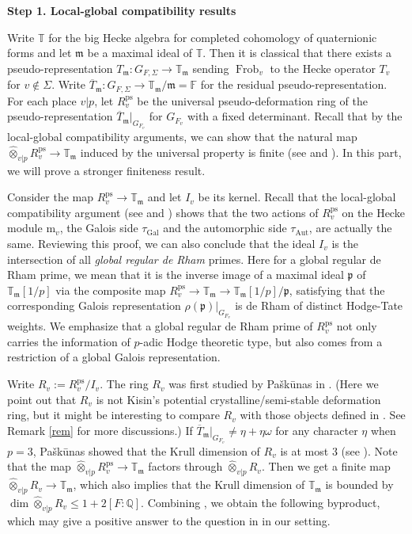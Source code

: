 \documentclass[a4paper, 12pt]{amsart}
\DeclareMathOperator{\Gal}{Gal}
\DeclareMathOperator{\Frob}{Frob}
\def\ps{\mathrm{ps}}
\newcommand{\F}{\mathbb{F}}
\newcommand{\Q}{\mathbb{Q}}
\newcommand{\T}{\mathbb{T}}
\newcommand{\kp}{\mathfrak{p}}
\newcommand{\km}{\mathfrak{m}}
\newcommand{\mm}{\mathrm{m}}
\begin{document}
	\textbf{Step 1.  Local-global compatibility results}
	
	Write $\T$ for the big Hecke algebra for completed cohomology of quaternionic forms and let $\km$ be a maximal ideal of $\T$. Then it is classical that there exists a pseudo-representation $T_\km: G_{F, \Sigma} \to  \T_{\km}$ sending $\Frob_v$ to the Hecke operator $T_v$ for $v \notin \Sigma$. Write $\overline{T}_\km: G_{F, \Sigma} \to  \T_{\km}/\km = \F$ for the residual pseudo-representation. For each place $v|p$, let $R_v^\ps$ be the universal pseudo-deformation ring of the pseudo-representation $\overline{T}_\km|_{G_{F_v}}$ for $G_{F_v}$ with a fixed determinant. Recall that by the local-global compatibility arguments, we can show that the natural map $\widehat{\otimes}_{v|p} R_v^\ps \to \T_{\km}$ induced by the universal property is finite (see \cite[Corollary 3.5.8]{pan2022fontaine} and \cite[Corollary 3.3.7]{Zhang:2024aa}). In this part, we will prove a stronger finiteness result.
	
	Consider the map $R_v^\ps \to \T_{\km} $ and let $I_v$ be its kernel. Recall that the local-global compatibility argument (see \cite[Theorem 3.5.3]{pan2022fontaine} and \cite[Theorem 3.3.3]{Zhang:2024aa}) shows that the two actions of $R_v^\ps$ on the Hecke module $\mm_v$, the Galois side $\tau_{\Gal}$ and the automorphic side $\tau_{\mathrm{Aut}}$, are actually the same. Reviewing this proof, we can also conclude that the ideal $I_v$ is the intersection of all \textit{global regular de Rham} primes. Here for a global regular de Rham prime, we mean that it is the inverse image of a maximal ideal $\kp$ of $ \T_{\km}[1/p]$ via the composite map $ R_v^\ps \to \T_{\km} \to \T_{\km}[1/p]/\kp$, satisfying that the corresponding Galois representation $\rho(\kp)|_{G_{F_v}}$ is de Rham of distinct Hodge-Tate weights. We emphasize that a global regular de Rham prime of $R_v^\ps$ not only carries the information of $p$-adic Hodge theoretic type, but also comes from a restriction of a global Galois representation.
	
	Write $R_v :=R_v^\ps/I_v $. The ring $R_v$ was first studied by Pašk\=unas in \cite{Paskunas_2021}. (Here we point out that $R_v$ is not Kisin's potential crystalline/semi-stable deformation ring, but it might be interesting to compare $R_v$ with those objects defined in \cite{Kisin2008}. See Remark \ref{rem} for more discussions.)  If $\overline{T}_\km|_{G_{F_v}} \ne \eta+\eta\omega$ for any character $\eta$ when $p=3$, Pašk\=unas showed that the Krull dimension of $R_v$ is at most $3$ (see \cite[Corollary 5.13]{Paskunas_2021}). Note that the map $\widehat{\otimes}_{v|p} R_v^\ps \to \T_{\km}$ factors through $\widehat{\otimes}_{v|p} R_v$. Then we get a finite map $\widehat{\otimes}_{v|p} R_v \to \T_{\km}$, which also implies that the Krull dimension of $\T_{\km} $ is bounded by $\dim \widehat{\otimes}_{v|p} R_v \le 1+2[F:\Q]$. Combining \cite[Theorem 3.6.1]{pan2022fontaine}, we obtain the following byproduct, which may give a positive answer to the question in \cite[page 255-256]{CE12} in our setting.
	
\end{document}
